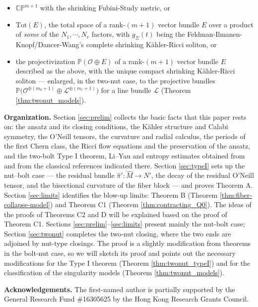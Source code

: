 \documentclass[11pt]{amsart}
\theoremstyle{plain}
\numberwithin{equation}{section}
\theoremstyle{definition}
\theoremstyle{remark}
\begin{document}
\begin{itemize}
\item $\mathbb{CP}^{m+1}$ with the shrinking Fubini-Study metric, or
\item $\textrm{Tot}(E)$, the total space of a rank-$(m+1)$ vector bundle $E$ over a product of \emph{some} of the $N_1, \cdots, N_r$ factors, with $g_\Sigma(t)$ being the Feldman-Ilmanen-Knopf/Dancer-Wang's complete shrinking K\"ahler-Ricci soliton, or
\item the projectivization $\mathbb{P}(\mathcal{O} \oplus E)$ of a rank-$(m+1)$ vector bundle $E$ described as the above, with the unique compact shrinking K\"ahler-Ricci soliton --- enlarged, in the two-nut case, to the projective bundles $\mathbb{P}\big(\mathcal{O}^{\oplus(m_0+1)} \oplus \mathcal{L}^{\oplus(m_\ell+1)}\big)$ for a line bundle $\mathcal{L}$ (Theorem \ref{thm:twonut_models}).
\end{itemize}



\medskip
\noindent\textbf{Organization.} Section \ref{sec:prelim} collects the basic facts that this paper rests on: the ansatz and its closing conditions, the K\"ahler structure and Calabi symmetry, the O'Neill tensors, the curvature and radial calculus, the periods of the first Chern class, the Ricci flow equations and the preservation of the ansatz, and the two-bolt Type I theorem, Li--Yau and entropy estimates obtained from \cite{FT} and from the classical references indicated there. Section \ref{sec:typeI} sets up the nut--bolt case --- the residual bundle $\widehat{\pi}' : \widehat{M} \to N'$, the decay of the residual O'Neill tensor, and the bisectional curvature of the fiber block --- and proves Theorem A. Section \ref{sec:limits} identifies the blow-up limits: Theorem B (Theorem \ref{thm:fiber-collapse-model}) and Theorem C1 (Theorem \ref{thm:contracting_Q0}). The ideas of the proofs of Theorems C2 and D will be explained based on the proof of Theorem C1. Sections \ref{sec:prelim}--\ref{sec:limits} present mainly the nut-bolt case; Section \ref{sec:twonut} completes the two-nut closing, where the two ends are adjoined by nut-type closings. The proof is a slightly modification from theorems in the bolt-nut case, so we will sketch its proof and points out the necessary modifications for the Type I theorem (Theorem \ref{thm:twonut_typeI}) and for the classification of the singularity models (Theorem \ref{thm:twonut_models}).

\medskip
\noindent\textbf{Acknowledgements.} The first-named author is partially supported by the General Research Fund \#16305625 by the Hong Kong Research Grants Council.
\end{document}
